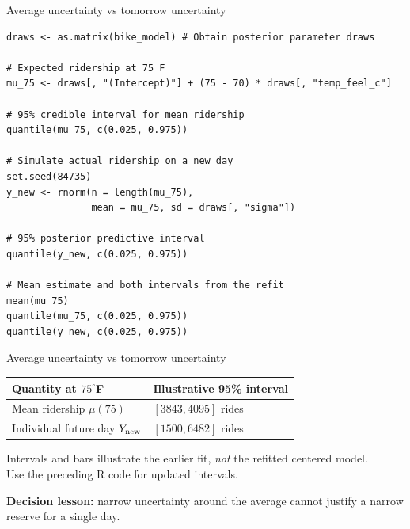 \documentclass[aspectratio=43,11pt]{beamer}
\begin{document}
\begin{frame}[fragile]{Average uncertainty vs tomorrow uncertainty}
\footnotesize
\begin{verbatim}
draws <- as.matrix(bike_model) # Obtain posterior parameter draws

# Expected ridership at 75 F
mu_75 <- draws[, "(Intercept)"] + (75 - 70) * draws[, "temp_feel_c"]

# 95% credible interval for mean ridership
quantile(mu_75, c(0.025, 0.975))

# Simulate actual ridership on a new day
set.seed(84735)
y_new <- rnorm(n = length(mu_75),
               mean = mu_75, sd = draws[, "sigma"])

# 95% posterior predictive interval
quantile(y_new, c(0.025, 0.975))

# Mean estimate and both intervals from the refit
mean(mu_75)
quantile(mu_75, c(0.025, 0.975))
quantile(y_new, c(0.025, 0.975))
\end{verbatim}
\end{frame}

\begin{frame}{Average uncertainty vs tomorrow uncertainty}
\begin{center}
\small
\begin{tabular}{p{4.3cm}p{4.8cm}}
\toprule Quantity at $75^\circ$F & Illustrative 95\% interval\\\midrule
Mean ridership $\mu(75)$ & $[3843,4095]$ rides\\
Individual future day $Y_{\rm new}$ & $[1500,6482]$ rides\\\bottomrule
\end{tabular}

\vspace{1cm}
\end{center}
\par\medskip\small Intervals and bars illustrate the earlier fit, \emph{not} the refitted centered model.\\
Use the preceding R code for updated intervals.
\par\medskip\textbf{Decision lesson:} narrow uncertainty around the average cannot justify a narrow reserve for a single day.
\end{frame}
\end{document}
